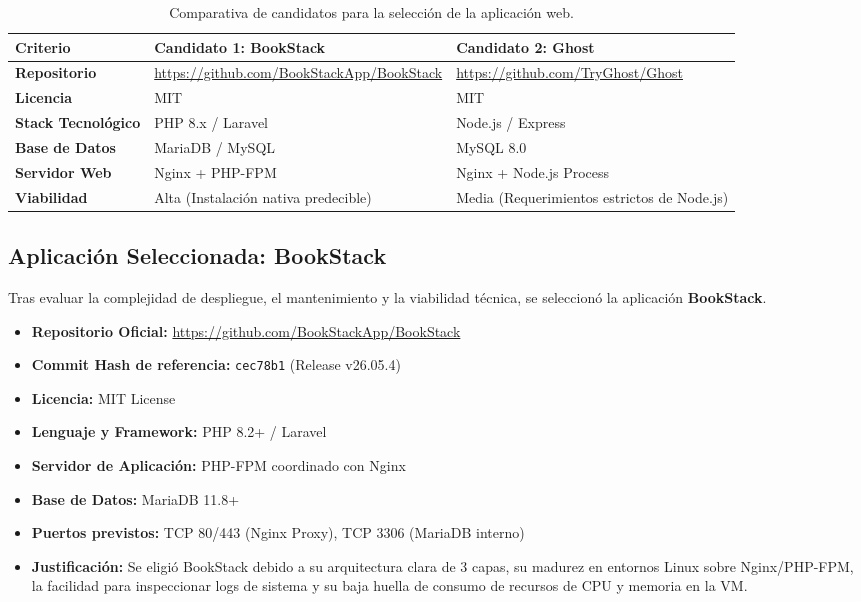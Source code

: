\documentclass[12pt,a4paper]{article}
\begin{document}
\begin{table}[h!]
\centering
\small
\begin{tabular}{|p{3cm}|p{5.5cm}|p{5.5cm}|}
\hline
\textbf{Criterio} & \textbf{Candidato 1: BookStack} & \textbf{Candidato 2: Ghost} \\ \hline
\textbf{Repositorio} & \url{https://github.com/BookStackApp/BookStack} & \url{https://github.com/TryGhost/Ghost} \\ \hline
\textbf{Licencia} & MIT & MIT \\ \hline
\textbf{Stack Tecnológico} & PHP 8.x / Laravel & Node.js / Express \\ \hline
\textbf{Base de Datos} & MariaDB / MySQL & MySQL 8.0 \\ \hline
\textbf{Servidor Web} & Nginx + PHP-FPM & Nginx + Node.js Process \\ \hline
\textbf{Viabilidad} & Alta (Instalación nativa predecible) & Media (Requerimientos estrictos de Node.js) \\ \hline
\end{tabular}
\caption{Comparativa de candidatos para la selección de la aplicación web.}
\label{tab:candidatos}
\end{table}

\subsection{Aplicación Seleccionada: BookStack}
Tras evaluar la complejidad de despliegue, el mantenimiento y la viabilidad técnica, se seleccionó la aplicación \textbf{BookStack}.

\begin{itemize}
    \item \textbf{Repositorio Oficial:} \url{https://github.com/BookStackApp/BookStack}
    \item \textbf{Commit Hash de referencia:} \texttt{cec78b1} (Release v26.05.4)
    \item \textbf{Licencia:} MIT License
    \item \textbf{Lenguaje y Framework:} PHP 8.2+ / Laravel
    \item \textbf{Servidor de Aplicación:} PHP-FPM coordinado con Nginx
    \item \textbf{Base de Datos:} MariaDB 11.8+
    \item \textbf{Puertos previstos:} TCP 80/443 (Nginx Proxy), TCP 3306 (MariaDB interno)
    \item \textbf{Justificación:} Se eligió BookStack debido a su arquitectura clara de 3 capas, su madurez en entornos Linux sobre Nginx/PHP-FPM, la facilidad para inspeccionar logs de sistema y su baja huella de consumo de recursos de CPU y memoria en la VM.
\end{itemize}
\end{document}

